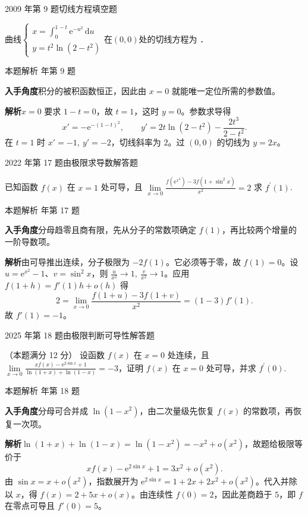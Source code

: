 \documentclass[UTF8,zihao=-4,fontset=fandol]{ctexart}
\renewcommand{\lim}{\operatorname*{lim}\limits}
\newcommand{\blank}{\underline{\hspace{5em}}}
\newcommand{\QuestionPage}[6]{%
  \par\noindent\begin{minipage}{\linewidth}
  \raggedright
  {\small\textcolor{black!60}{#3\quad #5}\hfill\textcolor{accent}{#2}}\par\smallskip}
\newcommand{\QuestionEnd}{\end{minipage}\par\medskip}
\newcommand{\QuestionPage}[6]{%
  \clearpage
  {\small\textcolor{accent}{#1\hfill #2}}\par\medskip
  {\small\textcolor{black!60}{#3\quad #5\hfill #6}}\par\vspace{9bp}}
\newcommand{\QuestionEnd}{}
\newenvironment{QuestionSolution}[1]{%
  \clearpage
  {\small\textcolor{black!60}{本题解析\quad #1}}\par\medskip
}{\par\clearpage}
\begin{document}
\QuestionPage{2.1 导数的概念}{填空题}{2009 年第 9 题}{2}{切线方程}{053 / 234}
曲线$\begin{cases}
  x = \int_0^{1- t} \mathrm{e}^{- u^2} \,\mathrm{d} u \\
  y = t^2\ln(2 - t^2)
\end{cases}$在$(0,0)$处的切线方程为 \blank{}．
\QuestionEnd

\begin{QuestionSolution}{2009 年第 9 题}
\textbf{入手角度}\quad 积分的被积函数恒正，因此由 \(x=0\) 就能唯一定位所需的参数值。

\textbf{解析}\quad \(x=0\) 要求 \(1-t=0\)，故 \(t=1\)，这时 \(y=0\)。参数求导得
\[
x'=-\mathrm{e}^{-(1-t)^2},\qquad
y'=2t\ln(2-t^2)-\frac{2t^3}{2-t^2}.
\]
在 \(t=1\) 时 \(x'=-1,\ y'=-2\)，切线斜率为 \(2\)。过 \((0,0)\) 的切线为 \(\boxed{y=2x}\)。
\end{QuestionSolution}

\QuestionPage{2.1 导数的概念}{解答题}{2022 年第 17 题}{2}{由极限求导数}{054 / 234}
已知函数 \(f\left( x \right)\) 在 \(x = 1\) 处可导，且
\(\lim_{x \to 0} \frac{f\left( \mathrm{e}^{x^{2}} \right) - 3f\left( 1 + \sin^{2}x \right)}{x^{2}} = 2\)
求 \(f^{\prime}\left( 1 \right)\).
\QuestionEnd

\begin{QuestionSolution}{2022 年第 17 题}
\textbf{入手角度}\quad 分母趋零且商有限，先从分子的常数项确定 \(f(1)\)，再比较两个增量的一阶导数项。

\textbf{解析}\quad 由可导推出连续，分子极限为 \(-2f(1)\)。它必须等于零，故 \(f(1)=0\)。设 \(u=\mathrm{e}^{x^2}-1\)、\(v=\sin^2x\)，则 \(\frac{u}{x^2}\to1,\ \frac{v}{x^2}\to1\)。应用 \(f(1+h)=f'(1)h+o(h)\) 得
\[
2=\lim_{x\to0}\frac{f(1+u)-3f(1+v)}{x^2}
=(1-3)f'(1).
\]
故 \(\boxed{f'(1)=-1}\)。
\end{QuestionSolution}

\QuestionPage{2.1 导数的概念}{解答题}{2025 年第 18 题}{3}{由极限判断可导性}{055 / 234}
（本题满分 12 分）
设函数 \(f\left( x \right)\) 在 \(x = 0\) 处连续，且 \(\lim_{x \to 0} \frac{x f\left( x \right) - \mathrm{e}^{2 \sin x} + 1}{\ln \left( 1 + x \right) + \ln \left( 1 - x \right)} = -3\)，证明 \(f\left( x \right)\) 在 \(x = 0\) 处可导，并求 \(f^{\prime}\left( 0 \right)\).
\QuestionEnd

\begin{QuestionSolution}{2025 年第 18 题}
\textbf{入手角度}\quad 分母可合并成 \(\ln(1-x^2)\)，由二次量级先恢复 \(f(x)\) 的常数项，再恢复一次项。

\textbf{解析}\quad \(\ln(1+x)+\ln(1-x)=\ln(1-x^2)=-x^2+o(x^2)\)，故题给极限等价于
\[
xf(x)-\mathrm{e}^{2\sin x}+1=3x^2+o(x^2).
\]
由 \(\sin x=x+o(x^2)\)，指数展开为 \(\mathrm{e}^{2\sin x}=1+2x+2x^2+o(x^2)\)。代入并除以 \(x\)，得 \(f(x)=2+5x+o(x)\)。由连续性 \(f(0)=2\)，因此差商趋于 \(5\)，即 \(f\) 在零点可导且 \(\boxed{f'(0)=5}\)。
\end{QuestionSolution}
\end{document}

